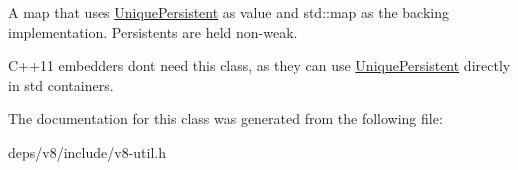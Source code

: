 A map that uses \hyperlink{classv8_1_1_unique_persistent}{Unique\+Persistent} as value and std\+::map as the backing implementation. Persistents are held non-\/weak.

C++11 embedders don\textquotesingle{}t need this class, as they can use \hyperlink{classv8_1_1_unique_persistent}{Unique\+Persistent} directly in std containers. 

The documentation for this class was generated from the following file\+:\begin{DoxyCompactItemize}
\item 
deps/v8/include/v8-\/util.\+h\end{DoxyCompactItemize}
